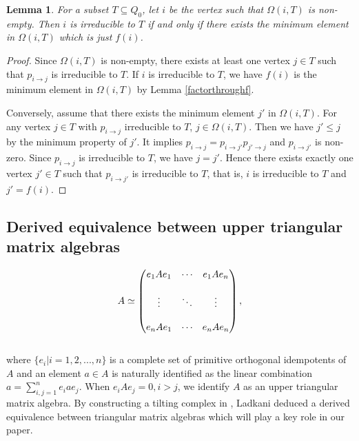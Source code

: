 \documentclass[a4paper, reqno]{amsart}
\newtheorem{lem}[thm]{Lemma}
\theoremstyle{definition}
\theoremstyle{remark}
\numberwithin{equation}{section}
\begin{document}
\begin{lem}
For a subset $T\subseteq Q_0$, let $i$ be the vertex such that $\Omega(i,T)$ is non-empty. Then $i$ is irreducible to $T$ if and only if there exists the minimum element in $\Omega(i,T)$ which is just $f(i)$.
\end{lem} 

\begin{proof}
Since $\Omega(i,T)$ is non-empty, there exists at least one vertex $j\in T$ such that $p_{i\to j}$ is irreducible to $T$. If $i$ is irreducible to $T$, we have $f(i)$ is the minimum element in $\Omega(i,T)$ by Lemma \ref{factorthroughf}.

Conversely, assume that there exists the minimum element $j'$ in $\Omega(i,T)$. For any vertex $j\in T$ with $p_{i\to j}$ irreducible to $T$, $j\in\Omega(i,T)$. Then we have $j'\leq j$ by the minimum property of $j'$. It implies $p_{i\to j}=p_{i\to j'}p_{j'\to j}$ and $p_{i\to j'}$ is non-zero. Since $p_{i\to j}$ is irreducible to $T$, we have $j=j'$. Hence there exists exactly one vertex $j'\in T$ such that $p_{i\to j'}$ is irreducible to $T$, that is, $i$ is irreducible to $T$ and $j'=f(i)$.
\end{proof}
\subsection{Derived equivalence between upper triangular matrix algebras}

\begin{equation*}\label{equa 04}
    A \simeq 
     \left( \begin{matrix}
     e_1 A e_1  & \cdots & e_1 A e_n      \cr\cr
        \vdots  & \ddots & \vdots      \cr\cr
     e_n A e_1  & \cdots & e_n A e_n    
\end{matrix}\right),
\end{equation*}\\
{where $\{e_i|i=1,2,...,n\}$ is a complete set of primitive orthogonal idempotents of $A$ and an element $a\in A$ is naturally identified as the linear combination $a = \sum_{i,j=1}^n e_i a e_j$. When $e_i A e_j = 0, i>j$, we identify $A$ as an upper triangular matrix algebra. By constructing a tilting complex in \cite{Lad2011}, Ladkani deduced a derived equivalence between triangular matrix algebras which will play a key role in our paper.}
\end{document}
